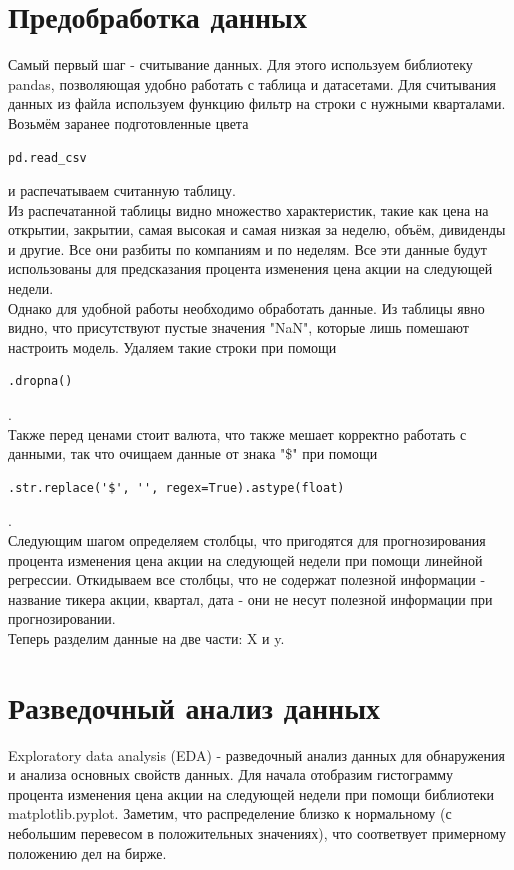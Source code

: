 \documentclass{article}
\begin{document}
\section{Предобработка данных}


Самый первый шаг - считывание данных. Для этого используем библиотеку pandas, позволяющая удобно работать с таблица и датасетами. Для считывания данных из файла используем функцию фильтр на строки с нужными кварталами. Возьмём заранее подготовленные цвета 
\begin{lstlisting}
pd.read_csv
\end{lstlisting} и распечатываем считанную таблицу.  
\\
 
Из распечатанной таблицы видно множество характеристик, такие как цена на открытии, закрытии, самая высокая и самая низкая за неделю, объём, дивиденды и другие. Все они разбиты по компаниям и по неделям.  Все эти данные будут использованы для предсказания процента изменения цена акции на следующей недели. 
\\
 
Однако для удобной работы необходимо обработать данные. Из таблицы явно видно, что присутствуют пустые значения "NaN", которые лишь помешают настроить модель. Удаляем такие строки при помощи \begin{lstlisting}
.dropna()
\end{lstlisting} .  
\\

Также перед ценами стоит валюта, что также мешает корректно работать с данными, так что очищаем данные от знака "\$" при помощи \begin{lstlisting}
.str.replace('$', '', regex=True).astype(float)
\end{lstlisting}. 
\\
 
Следующим шагом определяем столбцы, что пригодятся для прогнозирования процента изменения цена акции на следующей недели при помощи линейной регрессии. Откидываем все столбцы, что не содержат полезной информации - название тикера акции, квартал, дата - они не несут полезной информации при прогнозировании.  
\\
 
Теперь разделим данные на две части: X и y. 
\\
\section{Разведочный анализ данных}
Exploratory data analysis (EDA) - разведочный анализ данных для обнаружения и анализа основных свойств данных. Для начала отобразим гистограмму процента изменения цена акции на следующей недели при помощи библиотеки matplotlib.pyplot. Заметим, что распределение близко к нормальному (с небольшим перевесом в положительных значениях), что соответвует примерному положению дел на бирже. 
\\
 
\end{document}
